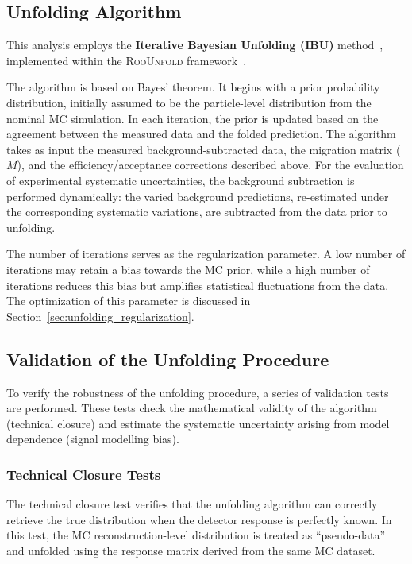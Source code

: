 \subsection{Unfolding Algorithm}

This analysis employs the \textbf{Iterative Bayesian Unfolding (IBU)} method~\cite{dagostini2010improved}, implemented within the \textsc{RooUnfold} framework~\cite{Adye:1349242}. 

The algorithm is based on Bayes' theorem. It begins with a prior probability distribution, initially assumed to be the particle-level distribution from the nominal MC simulation. In each iteration, the prior is updated based on the agreement between the measured data and the folded prediction. The algorithm takes as input the measured background-subtracted data, the migration matrix ($M$), and the efficiency/acceptance corrections described above. For the evaluation of experimental systematic uncertainties, the background subtraction is performed dynamically: the varied background predictions, re-estimated under the corresponding systematic variations, are subtracted from the data prior to unfolding.

The number of iterations serves as the regularization parameter. A low number of iterations may retain a bias towards the MC prior, while a high number of iterations reduces this bias but amplifies statistical fluctuations from the data. The optimization of this parameter is discussed in Section~\ref{sec:unfolding_regularization}.

\subsection{Validation of the Unfolding Procedure}
\label{sec:unfolding_validation}

To verify the robustness of the unfolding procedure, a series of validation tests are performed. These tests check the mathematical validity of the algorithm (technical closure) and estimate the systematic uncertainty arising from model dependence (signal modelling bias).

\subsubsection{Technical Closure Tests}

The technical closure test verifies that the unfolding algorithm can correctly retrieve the true distribution when the detector response is perfectly known. In this test, the MC reconstruction-level distribution is treated as ``pseudo-data'' and unfolded using the response matrix derived from the same MC dataset.

